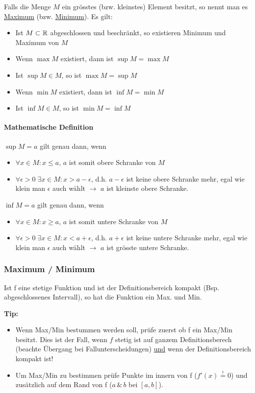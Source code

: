 Falls die Menge $M$ ein grösstes (bzw. kleinstes) Element besitzt, so nennt man es \underline{Maximum} (bzw. \underline{Minimum}).
Es gilt:
\begin{itemize}
	\item Ist $M \subset \mathbb{R}$ abgeschlossen und beschränkt, so existieren Minimum und Maximum von $M$
	\item Wenn $\max M$ existiert, dann ist $\sup M = \max M$
	\item Ist $\sup M \in M$, so ist $\max M = \sup M$
	\item Wenn $\min M$ existiert, dann ist $\inf M = \min M$
	\item Ist $\inf M \in M$, so ist $\min M = \inf M$
\end{itemize}

\paragraph{Mathematische Definition}
$\sup M = a$ gilt genau dann, wenn
\begin{itemize}
	\item $\forall x \in M: x \leq a$, $a$ ist somit obere Schranke von $M$
	\item $\forall \epsilon > 0 \; \exists x \in M: x > a - \epsilon$, d.h. $a - \epsilon$ ist keine obere Schranke mehr, egal wie klein man $\epsilon$ auch wählt $\rightarrow$ $a$ ist kleinste obere Schranke.
\end{itemize}

$\inf M = a$ gilt genau dann, wenn
\begin{itemize}
	\item $\forall x \in M: x \geq a$, $a$ ist somit untere Schranke von $M$
	\item $\forall \epsilon > 0 \; \exists x \in M: x < a + \epsilon$, d.h. $a + \epsilon$ ist keine untere Schranke mehr, egal wie klein man $\epsilon$ auch wählt $\rightarrow$ $a$ ist grösste untere Schranke.
\end{itemize}

\subsubsection{Maximum / Minimum} 
\begin{satz} Ist f eine stetige Funktion und ist der Definitionsbereich kompakt (Bsp. abgeschlossenes Intervall), so hat die Funktion ein Max. und Min.
\end{satz}
{\small
\textbf{Tip:} 
\begin{itemize}
	\item Wenn Max/Min bestummen werden soll, prüfe zuerst ob f ein Max/Min besitzt. Dies ist der Fall, wenn $f$ stetig ist auf ganzem Definitionsberech (beachte Übergang bei Fallunterscheidungen) \underline{und} wenn der Definitionsbereich kompakt ist!

	\item Um Max/Min zu bestimmen prüfe Punkte im innern von f ($f'(x) \overset{!}{=} 0$) und zusätzlich auf dem Rand von f ($a \, \& \, b$ bei $[a, b]$).
\end{itemize}}

